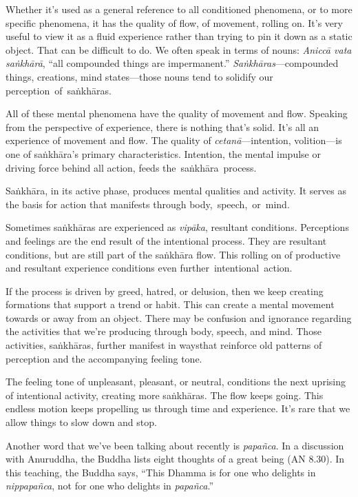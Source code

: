 Whether it's used as a general reference to all conditioned phenomena, or to more specific phenomena, it has the quality of flow, of movement, rolling on. It's very useful to view it as a fluid experience rather than trying to pin it down as a static object. That can be difficult to do. We often speak in terms of nouns: \emph{Aniccā vata saṅkhārā}, ``all compounded things are impermanent.'' \emph{Saṅkhāras}---compounded things, creations, mind states---those nouns tend to solidify our \mbox{perception of saṅkhāras.}

All of these mental phenomena have the quality of movement and flow. Speaking from the perspective of experience, there is nothing that's solid. It's all an experience of movement and flow. The quality of \emph{cetanā}---intention, volition---is one of saṅkhāra's primary characteristics. Intention, the mental impulse or driving force behind all action, feeds \mbox{the saṅkhāra process.}

Saṅkhāra, in its active phase, produces mental qualities and activity. It serves as the basis for action that manifests through \mbox{body, speech, or mind}.

Sometimes saṅkhāras are experienced as \emph{vipāka}, resultant conditions. Perceptions and feelings are the end result of the intentional process. They are resultant conditions, but are still part of the saṅkhāra flow. This rolling on of productive and resultant experience conditions even \mbox{further intentional action.}

If the process is driven by greed, hatred, or delusion, then we keep creating formations that support a trend or habit. This can create a mental movement towards or away from an object. There may be confusion and ignorance regarding the activities that we're producing through body, speech, and mind. Those activities, saṅkhāras, further manifest in waysthat reinforce old patterns of perception and the accompanying feeling tone.

The feeling tone of unpleasant, pleasant, or neutral, conditions the next uprising of intentional activity, creating more saṅkhāras. The flow keeps going. This endless motion keeps propelling us through time and experience. It's rare that we allow things to slow down and stop.

Another word that we've been talking about recently is \emph{papañca}. In a discussion with Anuruddha, the Buddha lists eight thoughts of a great being (AN 8.30). In this teaching, the Buddha says, ``This Dhamma is for one who delights in \emph{nippapañca}, not for one who delights in \emph{papañca}.''

